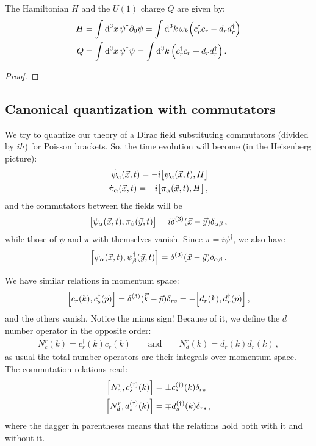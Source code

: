 \documentclass[main.tex]{subfiles}
\begin{document}
\begin{claim}
The Hamiltonian \(H\) and the \(U(1)\) charge \(Q\) are given by:
%
\begin{align}
    H &= \int \dd[3]{x} \psi ^\dag \partial_0 \psi  = \int \dd[3]{k} \omega_{k} \qty(c_r ^\dag c_r - d_r  d_r ^\dag)  \\
    Q &= \int \dd[3]{x} \psi ^\dag \psi = \int \dd[3]{k} \qty(c_r ^\dag c_r  + d_r d_r ^\dag) 
    \,.
\end{align}   
\end{claim}

\begin{proof}
\end{proof}

\subsection{Canonical quantization with commutators}

We try to quantize our theory of a Dirac field substituting commutators (divided by \(i \hbar\)) for Poisson brackets. So, the time evolution will become (in  the Heisenberg picture): 
%
\begin{align}
\dot{\psi}_{\alpha } (\vec{x}, t) =- i \qty[ \psi_{\alpha } (\vec{x}, t), H] \\
\dot{\pi}_{\alpha } (\vec{x}, t) =- i \qty[ \pi_{\alpha } (\vec{x}, t), H]
\,,
\end{align}
%
and the commutators between the fields will be 
%
\begin{align}
\qty[\psi_{\alpha }(\vec{x}, t), \pi_{\beta } (\vec{y}, t)] = i \delta^{(3)} (\vec{x} - \vec{y}) \delta_{\alpha \beta }
\,,
\end{align}
%
while those of \(\psi \) and \(\pi \) with themselves vanish. 
Since \(\pi  = i \psi ^\dag\), we also have 
%
\begin{align}
\qty[ \psi_{\alpha } (\vec{x}, t), \psi ^\dag_{\beta} (\vec{y}, t)] = \delta^{(3)} (\vec{x}- \vec{y}) \delta_{\alpha \beta }
\,.
\end{align}

We have similar relations in momentum space: 
%
\begin{align}
\qty[c_r (k), c_s ^\dag (p)] = \delta^{(3)} (\vec{k} - \vec{p}) \delta_{rs} = - \qty[d_r (k), d_r ^\dag (p)]
\,,
\end{align}
%
and the others vanish. Notice the minus sign! 
Because of it, we define the \(d\) number operator in the opposite order: 
%
\begin{align}
N_c^{r} (k) = c_r ^\dag (k) c_r (k)
\qquad \text{and} \qquad
N_d^{r} (k) = d_r (k) d_r  ^\dag (k)
\,,
\end{align}
%
as usual the total number operators are their integrals over momentum space. 
The commutation relations read: 
%
\begin{align}
\qty[N_c^{r}, c_s ^{(\dag)} (k)] &= \pm c_s ^{(\dag)} (k) \delta_{rs} \\
\qty[N_d^{r}, d_s ^{(\dag)} (k)] &= \mp d_s ^{(\dag)} (k) \delta_{rs}
\,,
\end{align}
%
where the dagger in parentheses means that the relations hold both with it and without it. 
\end{document}
